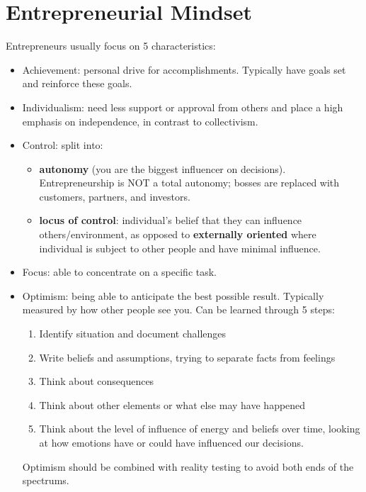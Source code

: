 \documentclass{article}
\begin{document}
    \section{Entrepreneurial Mindset}
    Entrepreneurs usually focus on 5 characteristics:
    \begin{itemize}
      \item Achievement: personal drive for accomplishments. Typically have goals set and reinforce these goals.
      \item Individualism: need less support or approval from others and place a high emphasis on independence, in contrast to collectivism.
      \item Control: split into:
        \begin{itemize}
          \item \textbf{autonomy} (you are the biggest influencer on decisions). Entrepreneurship is NOT a total autonomy; bosses are replaced with customers, partners, and investors.
          \item \textbf{locus of control}: individual's belief that they can influence others/environment, as opposed to \textbf{externally oriented} where individual is subject to other people and have minimal influence.
        \end{itemize}
        
      \item Focus: able to concentrate on a specific task.
      \item Optimism: being able to anticipate the best possible result. Typically measured by how other people see you. Can be learned through 5 steps:
        \begin{enumerate}
          \item Identify situation and document challenges
          \item Write beliefs and assumptions, trying to separate facts from feelings
          \item Think about consequences
          \item Think about other elements or what else may have happened
          \item Think about the level of influence of energy and beliefs over time, looking at how emotions have or could have influenced our decisions.
        \end{enumerate}
        Optimism should be combined with reality testing to avoid both ends of the spectrums.
    \end{itemize}
\end{document}
